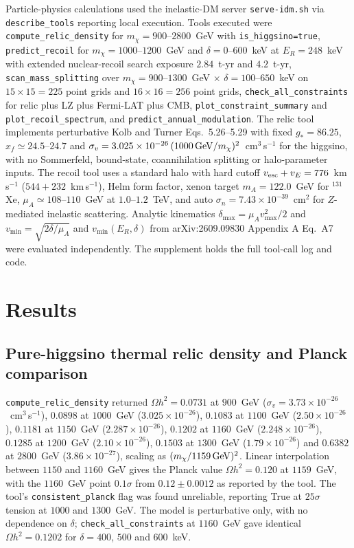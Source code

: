 \documentclass[11pt,a4paper]{article}
\begin{document}
Particle-physics calculations used the inelastic-DM server \texttt{serve-idm.sh} via \texttt{describe\_tools} reporting local execution. Tools executed were \texttt{compute\_relic\_density} for $m_{\chi}=900$--$2800$~GeV with \texttt{is\_higgsino=true}, \texttt{predict\_recoil} for $m_{\chi}=1000$--$1200$~GeV and $\delta=0$--$600$~keV at $E_{R}=248$~keV with extended nuclear-recoil search exposure $2.84$~t-yr and $4.2$~t-yr, \texttt{scan\_mass\_splitting} over $m_{\chi}=900$--$1300$~GeV $\times$ $\delta=100$--$650$~keV on $15\times15=225$ point grids and $16\times16=256$ point grids, \texttt{check\_all\_constraints} for relic plus LZ plus Fermi-LAT plus CMB, \texttt{plot\_constraint\_summary} and \texttt{plot\_recoil\_spectrum}, and \texttt{predict\_annual\_modulation}. The relic tool implements perturbative Kolb and Turner Eqs.~5.26--5.29 with fixed $g_{*}=86.25$, $x_{f}\simeq24.5$--$24.7$ and $\sigma_{v}=3.025\times10^{-26}\,(1000\,{\rm GeV}/m_{\chi})^{2}$~cm$^{3}$\,s$^{-1}$ for the higgsino, with no Sommerfeld, bound-state, coannihilation splitting or halo-parameter inputs. The recoil tool uses a standard halo with hard cutoff $v_{\rm esc}+v_{E}=776$~km\,s$^{-1}$ ($544+232$~km\,s$^{-1}$), Helm form factor, xenon target $m_{A}=122.0$~GeV for $^{131}$Xe, $\mu_{A}\simeq108$--$110$~GeV at $1.0$--$1.2$~TeV, and auto $\sigma_{n}=7.43\times10^{-39}$~cm$^{2}$ for $Z$-mediated inelastic scattering. Analytic kinematics $\delta_{\max}= \mu_{A}v_{\max}^{2}/2$ and $v_{\min}= \sqrt{2\delta/\mu_{A}}$ and $v_{\min}(E_{R},\delta)$ from arXiv:2609.09830 Appendix A Eq.~A7 were evaluated independently. The supplement holds the full tool-call log and code.

\section{Results}
\subsection{Pure-higgsino thermal relic density and Planck comparison}
\texttt{compute\_relic\_density} returned $\Omega h^{2}=0.0731$ at $900$~GeV ($\sigma_{v}=3.73\times10^{-26}$~cm$^{3}$\,s$^{-1}$), $0.0898$ at $1000$~GeV ($3.025\times10^{-26}$), $0.1083$ at $1100$~GeV ($2.50\times10^{-26}$), $0.1181$ at $1150$~GeV ($2.287\times10^{-26}$), $0.1202$ at $1160$~GeV ($2.248\times10^{-26}$), $0.1285$ at $1200$~GeV ($2.10\times10^{-26}$), $0.1503$ at $1300$~GeV ($1.79\times10^{-26}$) and $0.6382$ at $2800$~GeV ($3.86\times10^{-27}$), scaling as $(m_{\chi}/1159\,{\rm GeV})^{2}$. Linear interpolation between $1150$ and $1160$~GeV gives the Planck value $\Omega h^{2}=0.120$ at $1159$~GeV, with the $1160$~GeV point $0.1\sigma$ from $0.12\pm0.0012$ as reported by the tool. The tool's \texttt{consistent\_planck} flag was found unreliable, reporting True at $25\sigma$ tension at $1000$ and $1300$~GeV. The model is perturbative only, with no dependence on $\delta$; \texttt{check\_all\_constraints} at $1160$~GeV gave identical $\Omega h^{2}=0.1202$ for $\delta=400$, $500$ and $600$~keV.
\end{document}
